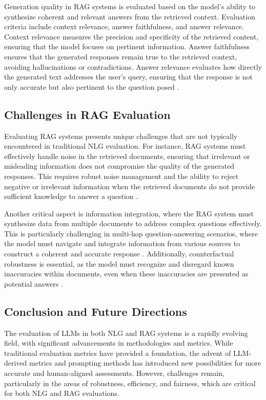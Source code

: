 Generation quality in RAG systems is evaluated based on the model’s ability to synthesize coherent and relevant answers from the retrieved context. Evaluation criteria include context relevance, answer faithfulness, and answer relevance. Context relevance measures the precision and specificity of the retrieved content, ensuring that the model focuses on pertinent information. Answer faithfulness ensures that the generated responses remain true to the retrieved context, avoiding hallucinations or contradictions. Answer relevance evaluates how directly the generated text addresses the user’s query, ensuring that the response is not only accurate but also pertinent to the question posed \cite{lewis2020retrieval}.

\subsection{Challenges in RAG Evaluation}

Evaluating RAG systems presents unique challenges that are not typically encountered in traditional NLG evaluation. For instance, RAG systems must effectively handle noise in the retrieved documents, ensuring that irrelevant or misleading information does not compromise the quality of the generated responses. This requires robust noise management and the ability to reject negative or irrelevant information when the retrieved documents do not provide sufficient knowledge to answer a question \cite{guu2020retrieval}.

Another critical aspect is information integration, where the RAG system must synthesize data from multiple documents to address complex questions effectively. This is particularly challenging in multi-hop question-answering scenarios, where the model must navigate and integrate information from various sources to construct a coherent and accurate response \cite{yang2018hotpotqa}. Additionally, counterfactual robustness is essential, as the model must recognize and disregard known inaccuracies within documents, even when these inaccuracies are presented as potential answers \cite{lewis2020retrieval}.

\subsection{Conclusion and Future Directions}

The evaluation of LLMs in both NLG and RAG systems is a rapidly evolving field, with significant advancements in methodologies and metrics. While traditional evaluation metrics have provided a foundation, the advent of LLM-derived metrics and prompting methods has introduced new possibilities for more accurate and human-aligned assessments. However, challenges remain, particularly in the areas of robustness, efficiency, and fairness, which are critical for both NLG and RAG evaluations.

